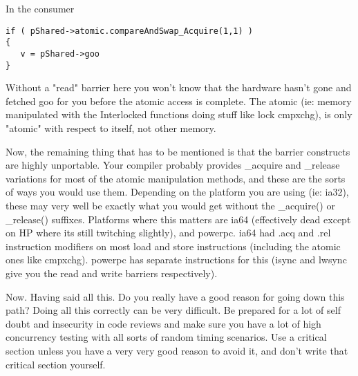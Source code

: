 In the consumer

\begin{lstlisting}
if ( pShared->atomic.compareAndSwap_Acquire(1,1) )
{
   v = pShared->goo 
}
\end{lstlisting}

Without a "read" barrier here you won't know that the hardware hasn't gone and fetched goo for you before the atomic access is complete. The atomic (ie: memory manipulated with the Interlocked functions doing stuff like lock cmpxchg), is only "atomic" with respect to itself, not other memory.

Now, the remaining thing that has to be mentioned is that the barrier constructs are highly unportable. Your compiler probably provides \_acquire and \_release variations for most of the atomic manipulation methods, and these are the sorts of ways you would use them. Depending on the platform you are using (ie: ia32), these may very well be exactly what you would get without the \_acquire() or \_release() suffixes. Platforms where this matters are ia64 (effectively dead except on HP where its still twitching slightly), and powerpc. ia64 had .acq and .rel instruction modifiers on most load and store instructions (including the atomic ones like cmpxchg). powerpc has separate instructions for this (isync and lwsync give you the read and write barriers respectively).

Now. Having said all this. Do you really have a good reason for going down this path? Doing all this correctly can be very difficult. Be prepared for a lot of self doubt and insecurity in code reviews and make sure you have a lot of high concurrency testing with all sorts of random timing scenarios. Use a critical section unless you have a very very good reason to avoid it, and don't write that critical section yourself.


\EndArticle
